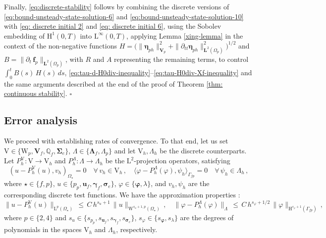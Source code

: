 \documentclass[11pt]{article}
\numberwithin{equation}{section}
\newcommand{\bgamma}{{\boldsymbol\gamma}}
\newcommand{\bLambda}{{\boldsymbol\Lambda}}
\newcommand{\bbeta}{{\boldsymbol\eta}}
\newcommand{\bsi}{{\boldsymbol\sigma}}
\newcommand{\bSigma}{{\boldsymbol\Sigma}}
\newcommand{\bvarphi}{{\boldsymbol\varphi}}
\newcommand{\f}{\mathbf{f}}
\newcommand{\bu}{\mathbf{u}}
\newcommand{\0}{{\mathbf{0}}}
\def\bV{\mathbf{V}}
\newcommand{\bL}{\mathbf{L}}
\newcommand\bbQ{\mathbb{Q}}
\def\H{\mathrm{H}}
\def\L{\mathrm{L}}
\def\V{\mathrm{V}}
\def\W{\mathrm{W}}
\newenvironment{proof}{\noindent{\it Proof.}}{\hfill$\square$}
\numberwithin{equation}{section}
\begin{document}
\begin{proof}
Finally, \eqref{eq:discrete-stability} follows by combining the discrete versions of \eqref{eq:bound-unsteady-state-solution-6} and \eqref{eq:bound-unsteady-state-solution-10} with \eqref{eq: discrete initial 2} and \eqref{eq: discrete initial 6}, using the Sobolev embedding of $\H^1(0,T)$ into $\L^\infty(0,T)$, applying Lemma \ref{xing-lemma} in the context of the non-negative functions $H=\big( \|\bbeta_{ph}\|^2_{\bV_p} + \|\partial_{tt}\bbeta_{ph}\|^2_{\bL^2(\Omega_p)}\big)^{1/2}$ and $B=\|\partial_{t}\,\f_p\|_{\bL^2(\Omega_p)}$, with $R$ and $A$ representing the remaining terms, to control $\int^t_0 B(s)\,H(s)\,ds$, \eqref{eq:tau-d-H0div-inequality}--\eqref{eq:tau-H0div-Xf-inequality} and the same arguments described at the end of the proof of Theorem \ref{thm: continuous stability}.
\end{proof}




\subsection{Error analysis}

We proceed with establishing rates of convergence.
To that end, let us set $\V\in \big\{ \W_p, \bV_f, \bbQ_f, \bSigma_{e} \big\}$, 
$\Lambda\in \big\{ \bLambda_f, \Lambda_p \big\}$ and let
$\V_h, \Lambda_h$ be the discrete counterparts. Let $P_h^{\V}: \V\to \V_h$ and 
$P_h^{\Lambda}: \Lambda\to \Lambda_h$ be the $\L^2$-projection operators, satisfying
\begin{equation}\label{eq:projection1}
( u - P_h^{\V}(u), v_{h} )_{\Omega_\star} = 0 \quad \forall\,v_h\in \V_{h}\,,\quad
\langle \varphi - P_h^{\Lambda}(\varphi), \psi_h \rangle_{\Gamma_{fp}} = 0  \quad\forall\, \psi_h\in \Lambda_{h}\,,
\end{equation}
where $\star\in \{f,p\}$, $u\in \big\{ p_p, \bu_f, \bgamma_f, \bsi_e \big\}$, $\varphi\in \big\{ \bvarphi, \lambda
\big\}$, and $v_h, \psi_h$ are the corresponding discrete test
functions. We have the approximation properties \cite{ciarlet1978}:
\begin{equation}\label{eq:approx-property1}
\|u - P^{\V}_h(u)\|_{\L^p(\Omega_\star)} 
\,\leq\, C\,h^{s_{u} + 1}\, \|u\|_{\W^{s_{u} + 1,p}(\Omega_\star)}\,,\quad
\|\varphi - P^{\Lambda}_h(\varphi)\|_{\Lambda} 
\,\leq\, C\,h^{s_{\varphi} + 1/2}\,
\|\varphi\|_{\H^{s_{\varphi} + 1}(\Gamma_{fp})} \,,
\end{equation}
where $p \in \{2,4\}$ and $s_{u}\in \big\{ s_{p_p}, s_{\bu_f}, s_{\bgamma_f}, s_{\bsi_e} \big\}$, $s_{\varphi}\in \big\{ s_{\bvarphi}, s_{\lambda} \big\}$ are the degrees of polynomials in the
spaces $\V_h$ and $\Lambda_h$, respectively. 
\end{document}
